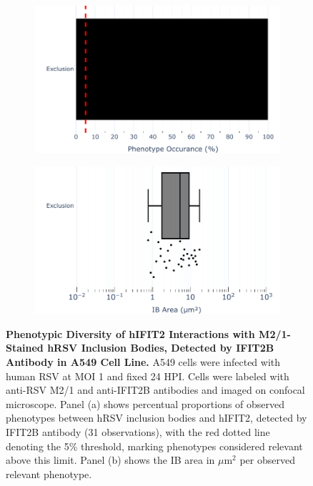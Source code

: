 \begin{figure}
    \begin{subfigure}{0.495\textwidth}
        \caption{}
        \includegraphics[width=1\linewidth]{08. Chapter 3/Figs/02. Infection/02. IFIT2/02. IFIT2B/07. bar_i2b_a549-m21.pdf} 
    \end{subfigure}
    \begin{subfigure}{0.495\textwidth}
        \caption{}
        \includegraphics[width=1\linewidth]{08. Chapter 3/Figs/02. Infection/02. IFIT2/02. IFIT2B/08. box_i2b_a549-m21.pdf}
    \end{subfigure}
    \caption[Phenotypic Diversity of hIFIT2 Interactions with M2/1-Stained hRSV Inclusion Bodies, Detected by IFIT2B Antibody in A549 Cell Line.]{\textbf{Phenotypic Diversity of hIFIT2 Interactions with M2/1-Stained hRSV Inclusion Bodies, Detected by IFIT2B Antibody in A549 Cell Line.} A549 cells were infected with human RSV at MOI 1 and fixed 24 HPI. Cells were labeled with anti-RSV M2/1 and anti-IFIT2B antibodies and imaged on confocal microscope. Panel (a) shows percentual proportions of observed phenotypes between hRSV inclusion bodies and hIFIT2, detected by IFIT2B antibody (31 observations), with the red dotted line denoting the 5\% threshold, marking phenotypes considered relevant above this limit. Panel (b) shows the IB area in \(\mu \mbox{m}^2\) per observed relevant phenotype.}
    \label{fig:Phenotypic Diversity of hIFIT2 Interactions with M2/1-Stained hRSV Inclusion Bodies, Detected by IFIT2B Antibody in A549 Cell Line}
\end{figure}

